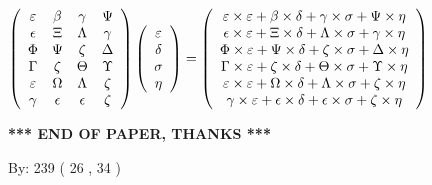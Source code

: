 \documentclass[12pt]{article}
\begin{document}
$  %
 \left( \begin{array}
 {
 c
 c
 c
 c
 }
 \varepsilon & 
 \beta & 
 \gamma & 
 \Psi \\ 
 \epsilon & 
                    \Xi & 
 \Lambda & 
 \gamma \\ 
 \Phi & 
 \Psi & 
                    \zeta & 
 \Delta \\ 
 \Gamma & 
                    \zeta & 
 \Theta & 
 \Upsilon \\ 
 \varepsilon & 
 \Omega & 
 \Lambda & 
                    \zeta \\ 
 \gamma & 
 \epsilon & 
 \epsilon & 
                    \zeta
 \end{array} \right)
 \left( \begin{array}
 {
 c
 }
 \varepsilon \\ 
 \delta \\ 
 \sigma \\ 
 \eta
 \end{array} \right)
=
  \left( \begin{array}
 {
 c
 }
 \varepsilon \times  \varepsilon   +  \beta \times  \delta   +  \gamma \times  \sigma   +  \Psi \times  \eta \\ 
 \epsilon \times  \varepsilon   +                     \Xi \times  \delta   +  \Lambda \times  \sigma   +  \gamma \times  \eta \\ 
 \Phi \times  \varepsilon   +  \Psi \times  \delta   +                     \zeta \times  \sigma   +  \Delta \times  \eta \\ 
 \Gamma \times  \varepsilon   +                     \zeta \times  \delta   +  \Theta \times  \sigma   +  \Upsilon \times  \eta \\ 
 \varepsilon \times  \varepsilon   +  \Omega \times  \delta   +  \Lambda \times  \sigma   +                     \zeta \times  \eta \\ 
 \gamma \times  \varepsilon   +  \epsilon \times  \delta   +  \epsilon \times  \sigma   +                     \zeta \times  \eta
 \end{array} \right)
$
 
 
 
   
   
 \vspace{0.2in}
 
   
   
   
   
\vspace{1.0in} 
{\textbf{\large{ *** END OF PAPER, THANKS *** }}} 
   
   
\hspace{1.0in} By: 
 239 ( 26 ,  34 )
   
\end{document}
